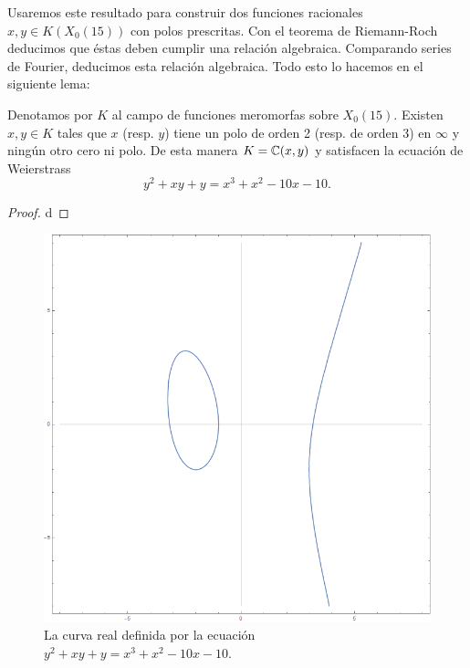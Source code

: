 \documentclass[../../tesis_maestria]{subfiles}
\begin{document}
Usaremos este resultado para construir dos funciones racionales $x,y\in K(X_0(15))$ con polos prescritas. Con el teorema de Riemann-Roch deducimos que éstas deben cumplir una relación algebraica. Comparando series de Fourier, deducimos esta relación algebraica. Todo esto lo hacemos en el siguiente lema:


\begin{lema}\label{lema:eqweierstrassX_0(15)}
	Denotamos por $K$ al campo de funciones meromorfas sobre $X_0(15)$. Existen $x,y\in K$ tales que $x$ (resp. $y$) tiene un polo de orden 2 (resp. de orden 3) en $\infty$ y ningún otro cero ni polo. De esta manera $K=\mathbb{C}(x,y)$ y satisfacen la ecuación de Weierstrass
	\[
		y^2+xy+y=x^3+x^2-10x-10.
	\]
\end{lema}
\begin{proof}
d
	
\end{proof}







\begin{figure}[!h]%
  \centering
  \includegraphics[scale=0.3]{figuras/eq_weierstrass}
  \caption{La curva real definida por la ecuación $y^2+xy+y=x^3+x^2-10x-10$.}
  \label{fig:eq_weierstrass}
\end{figure}%
\end{document}
